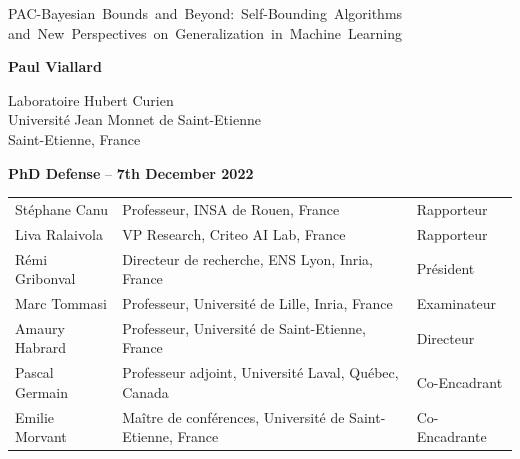 \documentclass{slides}
\author[{\bf Paul Viallard}]{}
\date[PhD Defense -- 7th December 2022]{}
\begin{document}

\begin{xframeplain}

\vspace{0.2cm}
\begin{center}

\begin{blackfill}
\mbox{PAC-Bayesian Bounds and Beyond: Self-Bounding Algorithms}\\ \mbox{and New Perspectives on Generalization in Machine Learning}
\end{blackfill}

\vspace{0.3cm}
{\large
{\bf Paul Viallard}\\[0.2cm]
}


\vspace{0.1cm}

{\scriptsize
{Laboratoire Hubert Curien}\\
{Université Jean Monnet de Saint-Etienne}\\
{Saint-Etienne, France}\\
}

\vspace{0.3cm}
{\large

\textbf{PhD Defense} -- \textbf{7th December 2022}
}

\vspace{0.3cm}

{\scriptsize
\begin{tabular}{lll}
\toprule
Stéphane Canu & Professeur, INSA de Rouen, France & Rapporteur\\
Liva Ralaivola & VP Research, Criteo AI Lab, France & Rapporteur\\
Rémi Gribonval & Directeur de recherche, ENS Lyon, Inria, France & Président\\
Marc Tommasi & Professeur, Université de Lille, Inria, France & Examinateur\\
Amaury Habrard & Professeur, Université de Saint-Etienne, France & Directeur \\
Pascal Germain & Professeur adjoint, Université Laval, Québec, Canada & Co-Encadrant\\
Emilie Morvant & Maître de conférences, Université de Saint-Etienne, France & Co-Encadrante\\
\bottomrule
\end{tabular}
}
\end{center}
\end{xframeplain}
\end{document}

